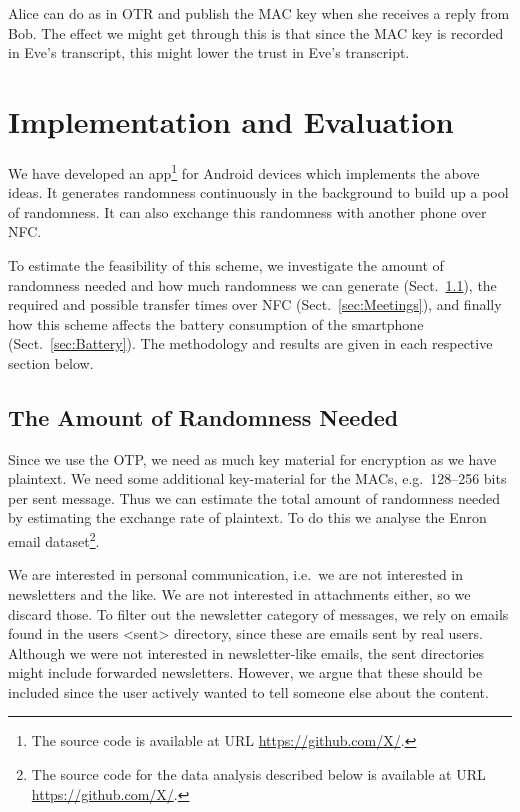 Alice can do as in \ac{OTR} and publish the \ac{MAC} key when she receives 
a reply from Bob.
The effect we might get through this is that since the \ac{MAC} key is recorded 
in Eve's transcript, this might lower the trust in Eve's transcript.


\section{Implementation and Evaluation}

We have developed an app\footnote{%
  The source code is available at URL \url{https://github.com/X/}.
} for Android devices which implements the above ideas.
It generates randomness continuously in the background to build up a pool of 
randomness.
It can also exchange this randomness with another phone over \ac{NFC}.

To estimate the feasibility of this scheme, we investigate the amount of 
randomness needed and how much randomness we can generate 
(Sect.~\ref{sec:NeededRandomness}), the required and possible transfer times 
over \ac{NFC} (Sect.~\ref{sec:Meetings}), and finally how this scheme affects 
the battery consumption of the smartphone (Sect.~\ref{sec:Battery}).
The methodology and results are given in each respective section below.

\subsection{The Amount of Randomness Needed}
\label{sec:NeededRandomness}
Since we use the \ac{OTP}, we need as much key material for encryption as we 
have plaintext.
We need some additional key-material for the \acp{MAC}, e.g.~128--256 bits 
per sent message.
Thus we can estimate the total amount of randomness needed by estimating the 
exchange rate of plaintext.
To do this we analyse the Enron email dataset\footnote{%
  The source code for the data analysis described below is available at URL 
  \url{https://github.com/X/}.
}.

We are interested in personal communication, i.e.~we are not interested in 
newsletters and the like.
We are not interested in attachments either, so we discard those.
To filter out the newsletter category of messages, we rely on emails found in 
the users <sent> directory, since these are emails sent by real users.
Although we were not interested in newsletter-like emails, the sent directories 
might include forwarded newsletters.
However, we argue that these should be included since the user actively wanted 
to tell someone else about the content.


